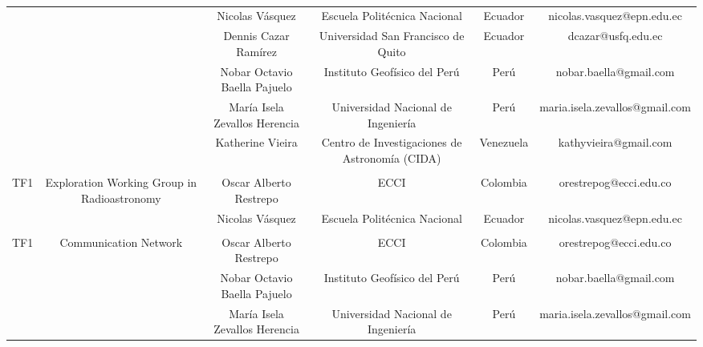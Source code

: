 \begin{table}[H]
{\begin{tabular}{cccccc}
\multicolumn{1}{c|}{} & \multicolumn{1}{c|}{} & \multicolumn{1}{c|}{Nicolas Vásquez} & \multicolumn{1}{c|}{Escuela Politécnica Nacional} & \multicolumn{1}{c|}{Ecuador} & \multicolumn{1}{c|}{nicolas.vasquez@epn.edu.ec} \\ \cline{3-6} 
\multicolumn{1}{c|}{} & \multicolumn{1}{c|}{} & \multicolumn{1}{c|}{Dennis Cazar Ramírez} & \multicolumn{1}{c|}{Universidad San Francisco de Quito} & \multicolumn{1}{c|}{Ecuador} & \multicolumn{1}{c|}{dcazar@usfq.edu.ec} \\ \cline{3-6} 
\multicolumn{1}{c|}{} & \multicolumn{1}{c|}{} & \multicolumn{1}{c|}{Nobar Octavio Baella Pajuelo} & \multicolumn{1}{c|}{Instituto Geofísico del Perú} & \multicolumn{1}{c|}{Perú} & \multicolumn{1}{c|}{nobar.baella@gmail.com} \\ \cline{3-6} 
\multicolumn{1}{c|}{} & \multicolumn{1}{c|}{} & \multicolumn{1}{c|}{María Isela Zevallos Herencia} & \multicolumn{1}{c|}{Universidad Nacional de Ingeniería} & \multicolumn{1}{c|}{Perú} & \multicolumn{1}{c|}{maria.isela.zevallos@gmail.com} \\ \cline{3-6} 
\multicolumn{1}{c|}{} & \multicolumn{1}{c|}{} & \multicolumn{1}{c|}{Katherine Vieira} & \multicolumn{1}{c|}{Centro de Investigaciones de Astronomía (CIDA)} & \multicolumn{1}{c|}{Venezuela} & \multicolumn{1}{c|}{kathyvieira@gmail.com} \\ \cline{2-6} 
 &  &  &  &  &  \\ \hline
\multicolumn{1}{|c|}{TF1} & \multicolumn{1}{c|}{\multirow{2}{*}{Exploration Working Group in Radioastronomy}} & \multicolumn{1}{c|}{Oscar Alberto Restrepo} & \multicolumn{1}{c|}{ECCI} & \multicolumn{1}{c|}{Colombia} & \multicolumn{1}{c|}{orestrepog@ecci.edu.co} \\ \cline{1-1} \cline{3-6} 
\multicolumn{1}{c|}{} & \multicolumn{1}{c|}{} & \multicolumn{1}{c|}{Nicolas Vásquez} & \multicolumn{1}{c|}{Escuela Politécnica Nacional} & \multicolumn{1}{c|}{Ecuador} & \multicolumn{1}{c|}{nicolas.vasquez@epn.edu.ec} \\ \cline{2-6} 
 &  &  &  &  &  \\ \hline
\multicolumn{1}{|c|}{TF1} & \multicolumn{1}{c|}{\multirow{3}{*}{Communication  Network}} & \multicolumn{1}{c|}{Oscar Alberto Restrepo} & \multicolumn{1}{c|}{ECCI} & \multicolumn{1}{c|}{Colombia} & \multicolumn{1}{c|}{orestrepog@ecci.edu.co} \\ \cline{1-1} \cline{3-6} 
\multicolumn{1}{c|}{} & \multicolumn{1}{c|}{} & \multicolumn{1}{c|}{Nobar Octavio Baella Pajuelo} & \multicolumn{1}{c|}{Instituto Geofísico del Perú} & \multicolumn{1}{c|}{Perú} & \multicolumn{1}{c|}{nobar.baella@gmail.com} \\ \cline{3-6} 
\multicolumn{1}{c|}{} & \multicolumn{1}{c|}{} & \multicolumn{1}{c|}{María Isela Zevallos Herencia} & \multicolumn{1}{c|}{Universidad Nacional de Ingeniería} & \multicolumn{1}{c|}{Perú} & \multicolumn{1}{c|}{maria.isela.zevallos@gmail.com} \\ \cline{2-6} 
\end{tabular}
}
\caption{}
\label{tab:my-table}
\end{table}


